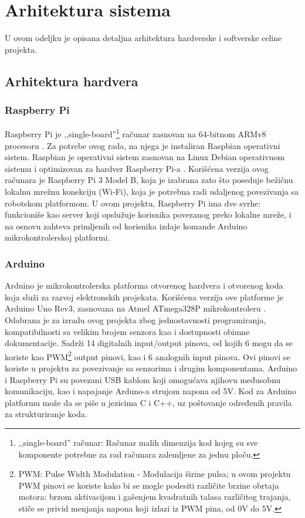\documentclass[12pt,a4paper]{report}
\begin{document}
\section{Arhitektura sistema} \label{sec:architecture}
U ovom odeljku je opisana detaljna arhitektura hardverske i softverske celine projekta.
\subsection{Arhitektura hardvera}
\subsubsection{Raspberry Pi}
Raspberry Pi je ,,single-board''\footnote{,,single-board'' računar: Računar malih dimenzija kod kojeg su sve komponente potrebne za rad računara zalemljene za jednu ploču.} računar zasnovan na 64-bitnom ARMv8 procesoru \cite{pi}. Za potrebe ovog rada, na njega je instaliran Raspbian operativni sistem. Raspbian je operativni sistem zasnovan na Linux Debian operativnom sistemu i optimizovan za hardver Raspberry Pi-a \cite{raspbian}. Korišćena verzija ovog računara je Raspberry Pi 3 Model B, koja je izabrana zato što poseduje bežičnu lokalnu mrežnu konekciju (Wi-Fi), koja je potrebna radi udaljenog povezivanja sa robotskom platformom. U ovom projektu, Raspberry Pi ima dve svrhe: funkcioniše kao server koji opslužuje korisnika povezanog preko lokalne mreže, i na osnovu zahteva primljenih od korisnika izdaje komande Arduino mikrokontrolerskoj platformi.
\subsubsection{Arduino}
Arduino je mikrokontrolerska platforma otvorenog hardvera i otvorenog koda koja služi za razvoj elektronskih projekata. Korišćena verzija ove platforme je Arduino Uno Rev3, zasnovana na Atmel ATmega328P mikrokontroleru \cite{arduino}. Odabrana je za izradu ovog projekta zbog jednostavnosti programiranja, kompatibilnosti sa velikim brojem senzora kao i dostupnosti obimne dokumentacije. Sadrži 14 digitalnih input/output pinova, od kojih 6 mogu da se koriste kao PWM\footnote{PWM: Pulse Width Modulation - Modulacija širine pulsa; u ovom projektu PWM pinovi se koriste kako bi se mogle podesiti različite brzine obrtaja motora: brzom aktivacijom i gašenjem kvadratnih talasa različitog trajanja, stiče se privid menjanja napona koji izlazi iz PWM pina, od 0V do 5V.} output pinovi, kao i 6 analognih input pinova. Ovi pinovi se koriste u projektu za povezivanje sa senzorima i drugim komponentama. Arduino i Raspberry Pi su povezani USB kablom koji omogućava njihovu međusobnu komunikaciju, kao i napajanje Arduno-a strujom napona od 5V. Kod za Arduino platformu može da se piše u jezicima C i C++, uz poštovanje određenih pravila za strukturiranje koda.
\end{document}
